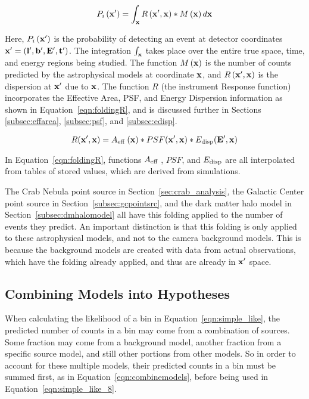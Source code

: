   \begin{equation}\label{eqn:folding}
    P_i \left( \mathbf{x'} \right ) = \int_{\mathbf{x }} R \left ( \mathbf{x'}, \mathbf{x } \right ) * M \left ( \mathbf{x } \right ) d\mathbf{x }
  \end{equation}
  
  Here, $P_i \left( \mathbf{x'} \right )$ is the probability of detecting an event at detector coordinates $\mathbf{x'} = \left ( \mathbf{l'}, \mathbf{b'}, \mathbf{E'}, \mathbf{t'} \right )$.
  The integration $\int_{\mathbf{x }}$ takes place over the entire true space, time, and energy regions being studied.
  The function $M\left ( \mathbf{x } \right )$ is the number of counts predicted by the astrophysical models at coordinate $\mathbf{x }$, and $R \left ( \mathbf{x'}, \mathbf{x } \right )$ is the dispersion at $\mathbf{x'}$ due to $\mathbf{x }$.
  The function $R$ (the instrument Response function) incorporates the Effective Area, PSF, and Energy Dispersion information as shown in Equation~\ref{eqn:foldingR}, and is discussed further in Sections \ref{subsec:effarea}, \ref{subsec:psf}, and \ref{subsec:edisp}.
  
  \begin{equation}\label{eqn:foldingR}
    R(\mathbf{x'},\mathbf{x }) = A_\textrm{eff }(\mathbf{x }) * PSF(\mathbf{x'},\mathbf{x }) * E_\textrm{disp}(\mathbf{E'},\mathbf{x })
  \end{equation}
  
  In Equation~\ref{eqn:foldingR}, functions $A_\textrm{eff }$, $PSF$, and $E_\textrm{disp}$ are all interpolated from tables of stored values, which are derived from simulations.

  The Crab Nebula point source in Section~\ref{sec:crab_analysis}, the Galactic Center point source in Section~\ref{subsec:gcpointsrc}, and the dark matter halo model in Section~\ref{subsec:dmhalomodel} all have this folding applied to the number of events they predict.
  An important distinction is that this folding is only applied to these astrophysical models, and not to the camera background models.
  This is because the background models are created with data from actual observations, which have the folding already applied, and thus are already in $\mathbf{x'}$ space.
  
  \subsection{Combining Models into Hypotheses}\label{subsec:hypotheses}
  
  When calculating the likelihood of a bin in Equation~\ref{eqn:simple_like}, the predicted number of counts in a bin may come from a combination of sources.
  Some fraction may come from a background model, another fraction from a specific source model, and still other portions from other models.
  So in order to account for these multiple models, their predicted counts in a bin must be summed first, as in Equation~\ref{eqn:combinemodels}, before being used in Equation~\ref{eqn:simple_like_8}.
  
